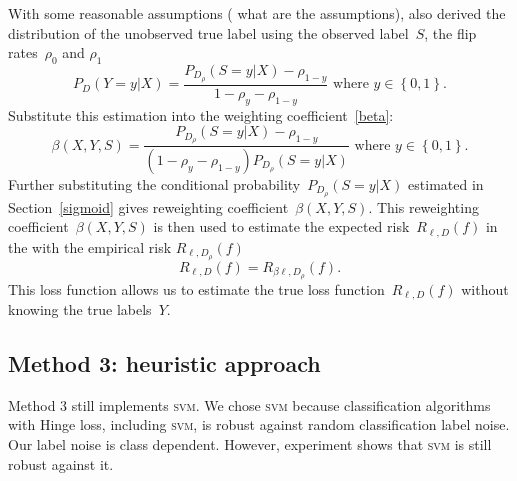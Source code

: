 \documentclass[12pt]{article} %
\newcommand{\loss}{\ell}
\begin{document}
With some reasonable assumptions ({\color{red} what are the assumptions}), \citet{liu2016classification} also derived the distribution of the unobserved  true label using the observed label~$S$, the flip rates~$\rho_{0}$ and $\rho_{1}$
\begin{equation}
    P_D(Y=y|X)=\frac{P_{D_\rho}(S=y|X)-\rho_{1-y}}{1-\rho_{y}-\rho_{1-y}}\text{ where }y\in \left\{0,1\right\}.
\end{equation}
Substitute this estimation into the weighting coefficient~\eqref{beta}:
\begin{equation}
    \beta(X,Y,S)=\frac{P_{D_\rho}(S=y|X)-\rho_{1-y}}{(1-\rho_{y}-\rho_{1-y})P_{D_\rho}(S=y|X)}\text{ where }y\in \left\{0,1\right\}.
\end{equation}
Further substituting the conditional probability~$P_{D_\rho}(S=y|X)$ estimated in Section~\ref{sigmoid} gives reweighting coefficient~$\beta(X,Y,S)$. 
This reweighting coefficient~$\beta(X,Y,S)$ is then used to estimate the expected risk~$R_{\loss,D}(f)$ in the with the empirical risk $R_{\loss,D_\rho}(f)$
\begin{equation}
R_{\loss,D}(f) = R_{\beta \loss,D_\rho}(f). \label{eq:loss}
\end{equation}
This loss function allows us to estimate the true loss function~$R_{\loss,D}(f)$ without knowing the true labels~$Y$. 

\subsection{Method 3: heuristic approach}\label{2nd}
Method 3 still implements \textsc{svm}. We chose \textsc{svm} because classification algorithms with Hinge loss, including \textsc{svm}, is robust against random classification label noise. Our label noise is class dependent. However, experiment shows that \textsc{svm} is still robust against it.
\end{document}
